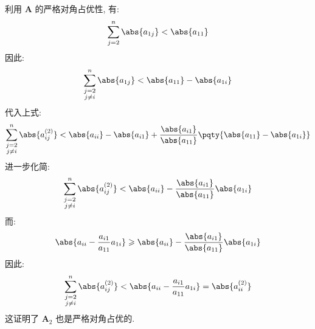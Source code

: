 \documentclass[lang = zh]{iwork}
\begin{document}
\begin{sol}
\begin{enumerate}
\begin{equation*}
          \end{equation*}
          利用 $\bm{A}$ 的严格对角占优性, 有:
          \begin{equation*}
            \sum_{j=2}^n \abs{a_{1j}} < \abs{a_{11}}
          \end{equation*}
          因此:
          \begin{equation*}
            \sum_{\substack{j=2 \\ j \neq i}}^n \abs{a_{1j}} < \abs{a_{11}} - \abs{a_{1i}}
          \end{equation*}
          代入上式:
          \begin{equation*}
            \sum_{\substack{j=2 \\ j \neq i}}^n \abs{a_{ij}^{(2)}} < \abs{a_{ii}} - \abs{a_{i1}} + \frac{\abs{a_{i1}}}{\abs{a_{11}}} \pqty{\abs{a_{11}} - \abs{a_{1i}}}
          \end{equation*}
          进一步化简:
          \begin{equation*}
            \sum_{\substack{j=2 \\ j \neq i}}^n \abs{a_{ij}^{(2)}} < \abs{a_{ii}} - \frac{\abs{a_{i1}}}{\abs{a_{11}}} \abs{a_{1i}}
          \end{equation*}
          而:
          \begin{equation*}
            \abs{a_{ii} - \frac{a_{i1}}{a_{11}} a_{1i}} \geqslant \abs{a_{ii}} - \frac{\abs{a_{i1}}}{\abs{a_{11}}} \abs{a_{1i}}
          \end{equation*}
          因此:
          \begin{equation*}
            \sum_{\substack{j=2 \\ j \neq i}}^n \abs{a_{ij}^{(2)}} < \abs{a_{ii} - \frac{a_{i1}}{a_{11}} a_{1i}} = \abs{a_{ii}^{(2)}}
          \end{equation*}
          这证明了 $\bm{A}_2$ 也是严格对角占优的.

\end{enumerate}
\end{sol}
\end{document}
